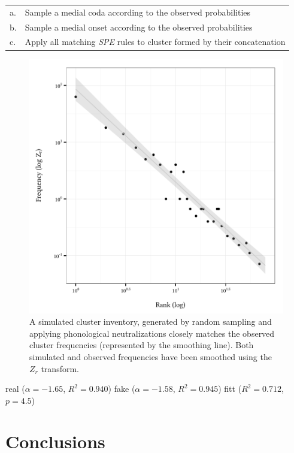 \begin{example}
\begin{tabular}{l l}
a. & Sample a medial coda according to the observed probabilities  \\
b. & Sample a medial onset according to the observed probabilities \\
c. & Apply all matching \emph{SPE} rules to cluster formed by their concatenation \\
\end{tabular}
\end{example}

\begin{figure}
\centering
\includegraphics{sim.pdf}
\caption{A simulated cluster inventory, generated by random sampling and applying phonological neutralizations closely matches the observed cluster frequencies (represented by the smoothing line). Both simulated and observed frequencies have been smoothed using the $Z_r$ transform.}
\label{sim}
\end{figure}

real ($\alpha = -1.65$, $R^2 = 0.940$)
fake ($\alpha = -1.58$, $R^2 = 0.945$)
fitt ($R^2 = 0.712$, $p = 4.5$)

\section{Conclusions}

